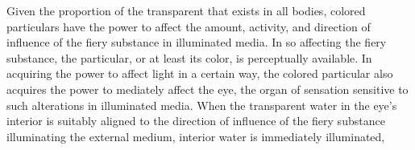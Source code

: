 Given the proportion of the transparent that exists in all bodies, colored particulars have the power to affect the amount, activity, and direction of influence of the fiery substance in illuminated media. In so affecting the fiery substance, the particular, or at least its color, is perceptually available. In acquiring the power to affect light in a certain way, the colored particular also acquires the power to mediately affect the eye, the organ of sensation sensitive to such alterations in illuminated media. When the transparent water in the eye's interior is suitably aligned to the direction of influence of the fiery substance illuminating the external medium, interior water is immediately illuminated, 



